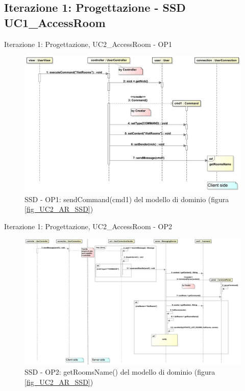 \subsection{Iterazione 1: Progettazione - SSD UC1\_AccessRoom}
\begin{frame} {Iterazione 1: Progettazione, UC2\_AccessRoom - OP1}
   \begin{figure}
     \includegraphics[scale=0.17]{image_astah/Iteration_1_DesignModel/UC2_AccessRoom_SSD_1_sendCommand.png}{\centering}
     \caption{SSD - OP1: sendCommand(cmd1) del modello di dominio (figura \ref{fig_UC2_AR_SSD}) }
     \label{fig_UC2_SSD_AC_1} 
   \end{figure}
\end{frame}

\begin{frame} {Iterazione 1: Progettazione, UC2\_AccessRoom - OP2}
   \begin{figure}
     \includegraphics[scale=0.11]{image_astah/Iteration_1_DesignModel/UC2_AccessRoom_SSD_2_getRoomsName.png}{\centering}
     \caption{SSD - OP2: getRoomsName() del modello di dominio (figura \ref{fig_UC2_AR_SSD}) }
     \label{fig_UC2_SSD_AC_2} 
   \end{figure}
\end{frame}

